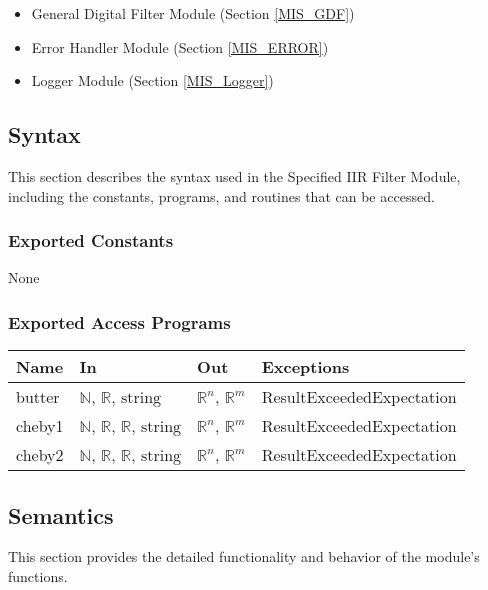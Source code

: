 \documentclass[12pt, titlepage]{article}
\begin{document}
\begin{itemize}
\item General Digital Filter Module (Section \ref{MIS_GDF})
\item Error Handler Module (Section \ref{MIS_ERROR})
\item Logger Module (Section \ref{MIS_Logger})
\end{itemize}

\subsection{Syntax}

This section describes the syntax used in the Specified IIR Filter Module,
including the constants, programs, and routines that can be accessed.

\subsubsection{Exported Constants}

None

\subsubsection{Exported Access Programs}

\begin{center}
\begin{tabular}{p{2cm} p{4cm} p{4cm} p{5cm}}
\hline
\textbf{Name} & \textbf{In} & \textbf{Out} & \textbf{Exceptions} \\
\hline
butter & $\mathbb{N}$, $\mathbb{R}$, $\text{string}$ & $\mathbb{R}^{n}$,
$\mathbb{R}^{m}$ & ResultExceededExpectation \\
cheby1 & $\mathbb{N}$, $\mathbb{R}$, $\mathbb{R}$, $\text{string}$ &
$\mathbb{R}^{n}$, $\mathbb{R}^{m}$ & ResultExceededExpectation \\
cheby2 & $\mathbb{N}$, $\mathbb{R}$, $\mathbb{R}$, $\text{string}$ &
$\mathbb{R}^{n}$, $\mathbb{R}^{m}$ & ResultExceededExpectation \\
\hline
\end{tabular}
\end{center}

\subsection{Semantics}

This section provides the detailed functionality and behavior of the module’s
functions.
\end{document}
